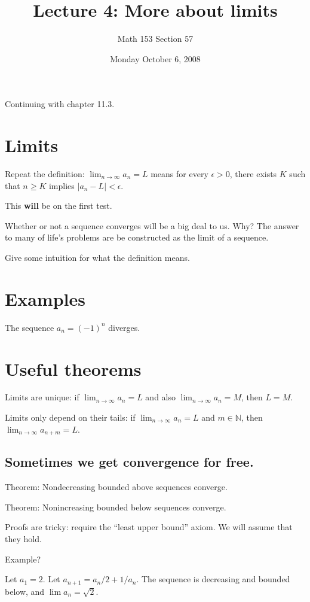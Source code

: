 \documentclass[12pt]{article}
\title{Lecture 4: More about limits}
\author{Math 153 Section 57}
\date{Monday October  6, 2008}
\newcommand{\N}{\mathbb{N}}
\begin{document}
\maketitle

Continuing with chapter 11.3.

\section{Limits}

Repeat the definition: $\lim_{n \to \infty} a_n =
L$ means for every $\epsilon > 0$, there exists $K$ such that $n \geq
K$ implies $|a_n - L| < \epsilon$.

This \textbf{will} be on the first test.

Whether or not a sequence converges will be a big deal to us.  Why?
The answer to many of life's problems are be constructed as the limit
of a sequence.

Give some intuition for what the definition means.

\section{Examples}

The sequence $a_n = (-1)^n$ diverges.

\section{Useful theorems}

Limits are unique: if $\lim_{n \to \infty} a_n = L$ and also $\lim_{n
  \to \infty} a_n = M$, then $L = M$.

Limits only depend on their tails: if $\lim_{n \to \infty} a_n = L$
and $m \in \N$, then $\lim_{n \to \infty} a_{n+m} = L$.

\subsection{Sometimes we get convergence for free.}

Theorem: Nondecreasing bounded above sequences converge.

Theorem: Nonincreasing bounded below sequences converge.

Proofs are tricky: require the ``least upper bound'' axiom.  We will
assume that they hold.

Example?

Let $a_1 = 2$.  Let $a_{n+1} = a_n/2 + 1/a_n$.  The sequence is
decreasing and bounded below, and $\lim a_n = \sqrt{2}$.
\end{document}

